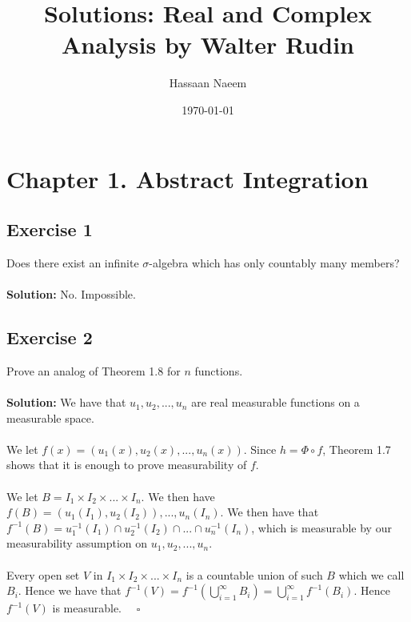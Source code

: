 \documentclass{article}
\title{Solutions: Real and Complex Analysis by Walter Rudin}
\author{Hassaan Naeem}
\date{\today}
\begin{document}
\maketitle


\section*{Chapter 1. Abstract Integration}
\subsection*{Exercise 1}
Does there exist an infinite $\sigma$-algebra which has only countably many members?
\\\\
\textbf{Solution:}
No. Impossible.

\subsection*{Exercise 2}
Prove an analog of Theorem 1.8 for $n$ functions.
\\\\
\textbf{Solution:}
We have that $u_1, u_2, ..., u_n$ are real measurable functions on a measurable space.
\\\\We let $f(x) = (u_1(x), u_2(x), ..., u_n(x))$.
Since $h = \Phi \circ f$, Theorem 1.7 shows that it is enough to prove measurability of $f$.
\\\\We let $B = I_1 \times I_2 \times ... \times I_n$. We then have $f(B) = (u_1(I_1), u_2(I_2)), ... , u_n(I_n)$.
We then have that $f^{-1}(B) = u_1^{-1}(I_1) \cap u_2^{-1}(I_2) \cap ... \cap u_n^{-1}(I_n)$,
which is measurable by our measurability assumption on $u_1, u_2, ..., u_n$.
\\\\Every open set $V$ in $I_1 \times I_2 \times ... \times I_n$ is a countable union of such $B$ which we call $B_i$.
Hence we have that $f^{-1}(V)=f^{-1}(\bigcup\limits_{i=1}^{\infty} B_i) = \bigcup\limits_{i=1}^{\infty} f^{-1}(B_i)$.
Hence $f^{-1}(V)$ is measurable. $\quad \square$
\end{document}
